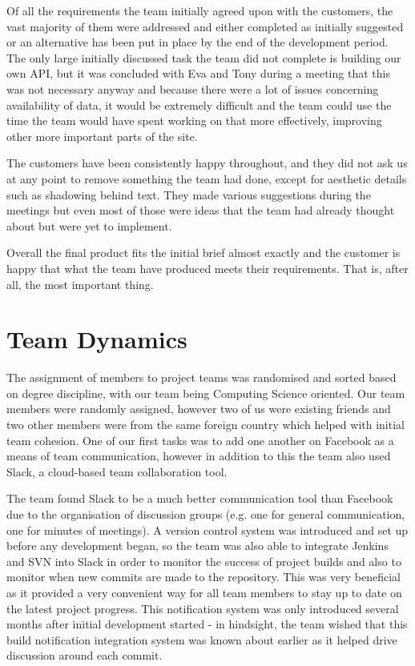 \documentclass{l3proj}
\begin{document}

Of all the requirements the team initially agreed upon with the customers, the vast majority of them were addressed and either completed as initially suggested or an alternative has been put in place by the end of the development period. The only large initially discussed task the team did not complete is building our own API, but it was concluded with Eva and Tony during a meeting that this was not necessary anyway and because there were a lot of issues concerning availability of data, it would be extremely difficult and the team could use the time the team would have spent working on that more effectively, improving other more important parts of the site.

The customers have been consistently happy throughout, and they did not ask us at any point to remove something the team had done, except for aesthetic details such as shadowing behind text. They made various suggestions during the meetings but even most of those were ideas that the team had already thought about but were yet to implement.

Overall the final product fits the initial brief almost exactly and the customer is happy that what the team have produced meets their requirements. That is, after all, the most important thing.

\section{Team Dynamics}
\label{sec:team-dynamics}

The assignment of members to project teams was randomised and sorted based on degree discipline, with our team being Computing Science oriented. Our team members were randomly assigned, however two of us were existing friends and two other members were from the same foreign country which helped with initial team cohesion. One of our first tasks was to add one another on Facebook as a means of team communication, however in addition to this the team also used Slack, a cloud-based team collaboration tool.

The team found Slack to be a much better communication tool than Facebook due to the organisation of discussion groups (e.g. one for general communication, one for minutes of meetings). A version control system was introduced and set up before any development began, so the team was also able to integrate Jenkins and SVN into Slack in order to monitor the success of project builds and also to monitor when new commits are made to the repository. This was very beneficial as it provided a very convenient way for all team members to stay up to date on the latest project progress. This notification system was only introduced several months after initial development started - in hindsight, the team wished that this build notification integration system was known about earlier as it helped drive discussion around each commit.
\end{document}
